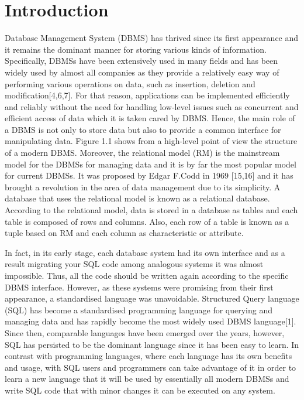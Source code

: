 \chapter{Introduction}

Database Management System (DBMS) has thrived since its first appearance and it remains the dominant manner for storing various kinds of information. Specifically, DBMSs have been extensively used in many fields and has been widely used by almost all companies as they provide a relatively easy way of performing various operations on data, such as insertion, deletion and modification[4,6,7]. For that reason, applications can be implemented efficiently and reliably without the need for handling low-level issues such as concurrent and efficient access of data which it is taken cared by DBMS. Hence, the main role of a DBMS is not only to store data but also to provide a common interface for manipulating data. Figure 1.1 shows from a high-level point of view the structure of a modern DBMS. Moreover, the relational model (RM) is the mainstream model for the DBMSs for managing data and it is by far the most popular model for current DBMSs. It was proposed by Edgar F.Codd in 1969 [15,16] and it has brought a revolution in the area of data management due to its simplicity. A database that uses the relational model is known as a relational database. According to the relational model, data is stored in a database as tables and each table is composed of rows and columns. Also, each row of a table is known as a tuple based on RM and each column as characteristic or attribute. 

In fact, in its early stage, each database system had its own interface and as a result migrating your SQL code among analogous systems it was almost impossible. Thus, all the code should be written again according to the specific DBMS interface. However, as these systems were promising from their first appearance, a standardised language was unavoidable. Structured Query language (SQL) has become a standardised programming language for querying and managing data and has rapidly become the most widely used DBMS language[1].  Since then, comparable languages have been emerged over the years, however, SQL has persisted to be the dominant language since it has been easy to learn. In contrast with programming languages, where each language has its own benefits and usage, with SQL users and programmers can take advantage of it in order to learn a new language that it will be used by essentially all modern DBMSs and write SQL code that with minor changes it can be executed on any system. 

